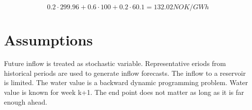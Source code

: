 \documentclass{article}
\begin{document}
$$0.2\cdot 299.96 + 0.6\cdot 100 + 0.2\cdot 60.1 = 132.02 NOK/GWh $$
\section{Assumptions}
Future inflow is treated as stochastic variable. Representative eriods from historical periods are used to generate inflow forecasts. The inflow to a reservoir is limited. The water value is a backward dynamic programming problem. Water value is known for week k+1. The end point does not matter as long as it is far enough ahead. 
\end{document}
